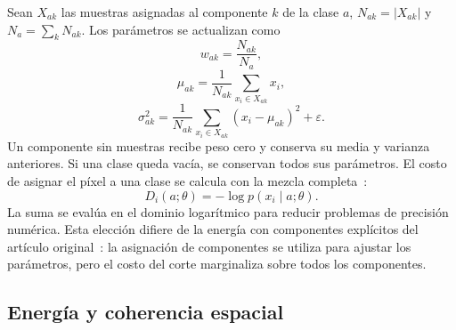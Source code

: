 Sean $X_{ak}$ las muestras asignadas al componente $k$ de la clase $a$,
$N_{ak}=|X_{ak}|$ y $N_a=\sum_k N_{ak}$. Los parámetros se actualizan como
\begin{equation}
 w_{ak}=\frac{N_{ak}}{N_a},
 \label{eq:actualizacion-pesos}
\end{equation}
\begin{equation}
 \mu_{ak}=\frac{1}{N_{ak}}\sum_{x_i\in X_{ak}}x_i,
 \label{eq:actualizacion-medias}
\end{equation}
\begin{equation}
 \sigma_{ak}^{2}=\frac{1}{N_{ak}}\sum_{x_i\in X_{ak}}(x_i-\mu_{ak})^2
 +\varepsilon.
 \label{eq:actualizacion-modelos}
\end{equation}
Un componente sin muestras recibe peso cero y conserva su media y varianza
anteriores. Si una clase queda vacía, se conservan todos sus parámetros.
El costo de asignar el píxel a una clase se calcula con la mezcla
completa~\cite{cuaderno}:
\begin{equation}
 D_i(a;\theta)=-\log p(x_i\mid a;\theta).
 \label{eq:costo-apariencia}
\end{equation}
La suma se evalúa en el dominio logarítmico para reducir problemas de
precisión numérica. Esta elección difiere de la energía con componentes
explícitos del artículo original~\cite{rother2004}: la
asignación de componentes se utiliza para ajustar los parámetros, pero el
costo del corte marginaliza sobre todos los componentes.

\subsection{Energía y coherencia espacial}

